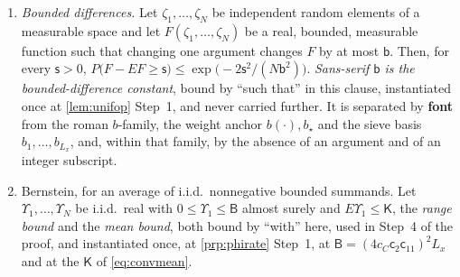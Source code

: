 \begin{lemma}\label{lem:bdiff}
\begin{enumerate}
\item[(i)] \emph{Bounded differences.} Let $\zeta_1,\dots,\zeta_N$ be independent random elements of a
measurable space and let $F(\zeta_1,\dots,\zeta_N)$ be a real, bounded, measurable function such that
changing one argument changes $F$ by at most $\mathsf b$. Then, for every $\mathsf s>0$,
$P\big(F-EF\ge\mathsf s\big)\le\exp\!\big(-2\mathsf s^{2}/(N\mathsf b^{2})\big)$.
\emph{Sans-serif $\mathsf b$ is the bounded-difference constant}, bound by ``such that'' in this clause,
instantiated once at \cref{lem:unifop} Step~1, and never carried further. It is separated by
\textbf{font} from the roman
$b$-family, the weight anchor $b(\cdot),b_\star$ and the sieve basis
$b_1,\dots,b_{L_x}$, and, within that family, by the absence of an argument and of an
integer subscript.
\item[(ii)] Bernstein, for an average of i.i.d.\ nonnegative bounded summands. Let
$\varUpsilon_1,\dots,\varUpsilon_N$ be i.i.d.\ real with $0\le\varUpsilon_1\le\mathsf B$ almost surely
and $E\varUpsilon_1\le\mathsf K$, the \emph{range bound} and the \emph{mean bound}, both bound by
``with'' here, used in Step~4 of the proof, and instantiated once, at \cref{prp:phirate} Step~1, at
$\mathsf B=(4c_C\mathsf c_2\mathsf c_{11})^{2}L_x$ and at the $\mathsf K$ of \eqref{eq:convmean}.

\end{enumerate}
\end{lemma}
